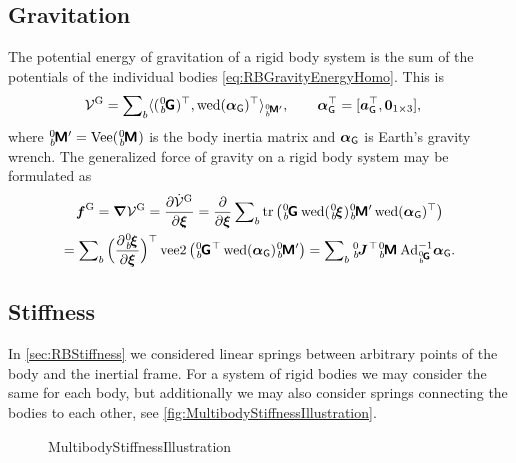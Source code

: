 \subsection{Gravitation}
The potential energy of gravitation of a rigid body system is the sum of the potentials of the individual bodies \eqref{eq:RBGravityEnergyHomo}.
This is
\begin{align}\label{eq:RBSPotentialGravity}
 \potentialGravity
 &= \sumBodies \sProd[\bodyInertiaMatp{0}{\BidxII}]{(\bodyHomoCoord{0}{\BidxII})^\top}{\wedOp(\gravityAccWrench)^\top},
\qquad 
 \gravityAccWrench^\top = [\gravityAcc^\top, \tuple{0}_{1\times3} ],
\end{align}
where $\bodyInertiaMatp{0}{\BidxII} = \veeMatOp(\bodyInertiaMat{0}{\BidxII})$ is the body inertia matrix and $\boldsymbol{\alpha}_{\mathsf{G}}$ is Earth's gravity wrench.
The generalized force of gravity on a rigid body system may be formulated as
\begin{multline}\label{eq:RBSGenForceGravity}
 \genForceGravity = \differential\potentialGravity
 = \frac{\partial \potentialGravityd}{\partial \sysVel}
 = \frac{\partial}{\partial \sysVel} \sumBodies \tr\big( \bodyHomoCoord{0}{\BidxII} \wedOp(\bodyVel{0}{\BidxII}) \bodyInertiaMatp{0}{\BidxII} \wedOp(\gravityAccWrench)^\top \big)
\\ 
 = \sumBodies \Big(\frac{\partial \bodyVel{0}{\BidxII}}{\partial \sysVel}\Big)^\top \veeTwoOp\big( \bodyHomoCoord{0}{\BidxII}^\top \wedOp(\gravityAccWrench) \bodyInertiaMatp{0}{\BidxII} \big) 
 = \sumBodies \bodyJac{0}{\BidxII}^\top \bodyInertiaMat{0}{\BidxII} \, \Ad{\bodyHomoCoord{0}{\BidxII}}^{-1} \gravityAccWrench
 .
\end{multline}

\subsection{Stiffness}
In \autoref{sec:RBStiffness} we considered linear springs between arbitrary points of the body and the inertial frame.
For a system of rigid bodies we may consider the same for each body, but additionally we may also consider springs connecting the bodies to each other, see \autoref{fig:MultibodyStiffnessIllustration}.

\begin{figure}[ht]
 \centering
 
 \caption{MultibodyStiffnessIllustration}
 \label{fig:MultibodyStiffnessIllustration}
\end{figure}

